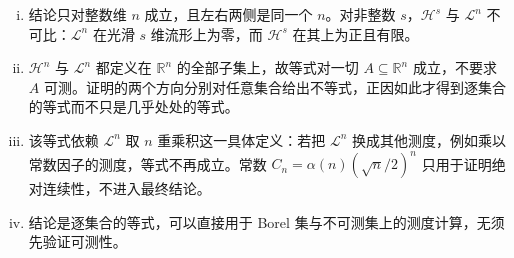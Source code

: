 \documentclass[../../main.tex]{subfiles}%
\begin{document}
\begin{remark}\label{remark:ch02-thm-2-5-条件}
\begin{enumerate}[(i)]
\item 结论只对整数维 $n$ 成立，且左右两侧是同一个 $n$。对非整数 $s$，$\mathcal{H}^s$ 与 $\mathcal{L}^n$ 不可比：$\mathcal{L}^n$ 在光滑 $s$ 维流形上为零，而 $\mathcal{H}^s$ 在其上为正且有限。
\item $\mathcal{H}^n$ 与 $\mathcal{L}^n$ 都定义在 $\mathbb{R}^n$ 的全部子集上，故等式对一切 $A\subseteq\mathbb{R}^n$ 成立，不要求 $A$ 可测。证明的两个方向分别对任意集合给出不等式，正因如此才得到逐集合的等式而不只是几乎处处的等式。
\item 该等式依赖 $\mathcal{L}^n$ 取 $n$ 重乘积这一具体定义：若把 $\mathcal{L}^n$ 换成其他测度，例如乘以常数因子的测度，等式不再成立。常数 $C_n=\alpha(n)(\sqrt n/2)^n$ 只用于证明绝对连续性，不进入最终结论。
\item 结论是逐集合的等式，可以直接用于 Borel 集与不可测集上的测度计算，无须先验证可测性。
\end{enumerate}
\end{remark}
\end{document}

